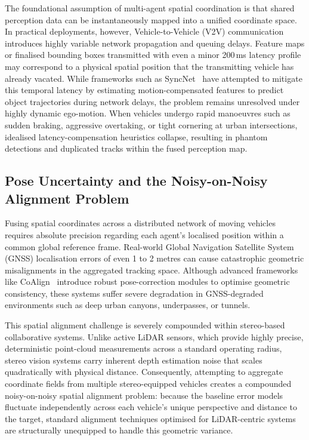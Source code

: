 The foundational assumption of multi-agent spatial coordination is that shared
perception data can be instantaneously mapped into a unified coordinate space. In
practical deployments, however, Vehicle-to-Vehicle (V2V) communication introduces
highly variable network propagation and queuing delays. Feature maps or finalised
bounding boxes transmitted with even a minor 200\,ms latency profile may
correspond to a physical spatial position that the transmitting vehicle has
already vacated. While frameworks such as SyncNet~\cite{lei2022} have attempted to
mitigate this temporal latency by estimating motion-compensated features to
predict object trajectories during network delays, the problem remains unresolved
under highly dynamic ego-motion. When vehicles undergo rapid manoeuvres such as
sudden braking, aggressive overtaking, or tight cornering at urban intersections,
idealised latency-compensation heuristics collapse, resulting in phantom
detections and duplicated tracks within the fused perception map.

\subsection{Pose Uncertainty and the Noisy-on-Noisy Alignment Problem}

Fusing spatial coordinates across a distributed network of moving vehicles
requires absolute precision regarding each agent's localised position within a
common global reference frame. Real-world Global Navigation Satellite System
(GNSS) localisation errors of even 1 to 2 metres can cause catastrophic geometric
misalignments in the aggregated tracking space. Although advanced frameworks like
CoAlign~\cite{lu2023} introduce robust pose-correction modules to optimise
geometric consistency, these systems suffer severe degradation in GNSS-degraded
environments such as deep urban canyons, underpasses, or tunnels.

This spatial alignment challenge is severely compounded within stereo-based
collaborative systems. Unlike active LiDAR sensors, which provide highly precise,
deterministic point-cloud measurements across a standard operating radius, stereo
vision systems carry inherent depth estimation noise that scales quadratically
with physical distance. Consequently, attempting to aggregate coordinate fields
from multiple stereo-equipped vehicles creates a compounded noisy-on-noisy spatial
alignment problem: because the baseline error models fluctuate independently
across each vehicle's unique perspective and distance to the target, standard
alignment techniques optimised for LiDAR-centric systems are structurally
unequipped to handle this geometric variance.

